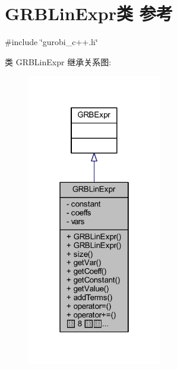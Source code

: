 \hypertarget{classGRBLinExpr}{}\section{G\+R\+B\+Lin\+Expr类 参考}
\label{classGRBLinExpr}


{\ttfamily \#include \char`\"{}gurobi\+\_\+c++.\+h\char`\"{}}



类 G\+R\+B\+Lin\+Expr 继承关系图\+:
\nopagebreak
\begin{figure}[H]
\begin{center}
\leavevmode
\includegraphics[width=166pt]{classGRBLinExpr__inherit__graph}
\end{center}
\end{figure}


